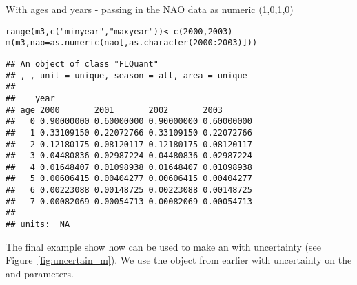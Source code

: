 \documentclass[a4paper,english,10pt]{article}\usepackage[]{graphicx}\usepackage[]{color}
\makeatletter
\newcommand{\hlnum}[1]{\textcolor[rgb]{0.063,0.58,0.627}{#1}}%
\newcommand{\hlstr}[1]{\textcolor[rgb]{0.063,0.58,0.627}{#1}}%
\newcommand{\hlopt}[1]{\textcolor[rgb]{0.196,0.196,0.196}{#1}}%
\newcommand{\hlstd}[1]{\textcolor[rgb]{0.196,0.196,0.196}{#1}}%
\newcommand{\hlkwb}[1]{\textcolor[rgb]{0.627,0,0.314}{#1}}%
\newcommand{\hlkwc}[1]{\textcolor[rgb]{0,0.631,0.314}{#1}}%
\newcommand{\hlkwd}[1]{\textcolor[rgb]{0.78,0.227,0.412}{#1}}%
\newenvironment{kframe}{%
 \def\at@end@of@kframe{}%
 \ifinner\ifhmode%
  \def\at@end@of@kframe{\end{minipage}}%
  \begin{minipage}{\columnwidth}%
 \fi\fi%
 \def\FrameCommand##1{\hskip\@totalleftmargin \hskip-\fboxsep
 \colorbox{shadecolor}{##1}\hskip-\fboxsep
     \hskip-\linewidth \hskip-\@totalleftmargin \hskip\columnwidth}%
 \MakeFramed {\advance\hsize-\width
   \@totalleftmargin\z@ \linewidth\hsize
   \@setminipage}}%
 {\par\unskip\endMakeFramed%
 \at@end@of@kframe}
\newenvironment{knitrout}{}{} %
\makeatother
\begin{document}
With ages and years - passing in the NAO data as numeric (1,0,1,0)

\begin{knitrout}
\color{fgcolor}\begin{kframe}
\begin{alltt}
\hlkwd{range}\hlstd{(m3,} \hlkwd{c}\hlstd{(}\hlstr{"minyear"}\hlstd{,} \hlstr{"maxyear"}\hlstd{))} \hlkwb{<-} \hlkwd{c}\hlstd{(}\hlnum{2000}\hlstd{,} \hlnum{2003}\hlstd{)}
\hlkwd{m}\hlstd{(m3,} \hlkwc{nao} \hlstd{=} \hlkwd{as.numeric}\hlstd{(nao[,} \hlkwd{as.character}\hlstd{(}\hlnum{2000}\hlopt{:}\hlnum{2003}\hlstd{)]))}
\end{alltt}
\begin{verbatim}
## An object of class "FLQuant"
## , , unit = unique, season = all, area = unique
## 
##    year
## age 2000       2001       2002       2003      
##   0 0.90000000 0.60000000 0.90000000 0.60000000
##   1 0.33109150 0.22072766 0.33109150 0.22072766
##   2 0.12180175 0.08120117 0.12180175 0.08120117
##   3 0.04480836 0.02987224 0.04480836 0.02987224
##   4 0.01648407 0.01098938 0.01648407 0.01098938
##   5 0.00606415 0.00404277 0.00606415 0.00404277
##   6 0.00223088 0.00148725 0.00223088 0.00148725
##   7 0.00082069 0.00054713 0.00082069 0.00054713
## 
## units:  NA
\end{verbatim}
\end{kframe}
\end{knitrout}

The final example show how  can be used to make an  with uncertainty (see Figure~\ref{fig:uncertain_m}). We use the  object from earlier with uncertainty on the  and  parameters.
\end{document}
